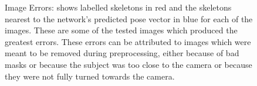 \documentclass[11pt]{article} %
\begin{document}
\begin{figure}
\centering
{}
\qquad%
%
\caption{Image Errors: shows labelled skeletons in red and the skeletons nearest to the network's predicted pose vector in blue for each of the images. These are some of the tested images which produced the greatest errors. These errors can be attributed to images which were meant to be removed during preprocessing, either because of bad masks or because the subject was too close to the camera or because they were not fully turned towards the camera.}
\label{fig:badImages}
\end{figure}
\end{document}
